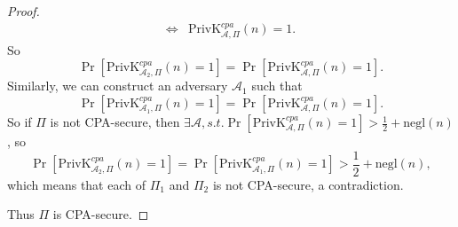 \documentclass[12pt]{article}
\newcommand{\privk}{\text{PrivK}}
\newcommand{\negl}{\text{negl}}
\newcommand{\A}{\mathcal{A}}
\newenvironment{problem}[2][Problem]{\begin{trivlist}
\item[\hskip \labelsep {\bfseries #1}\hskip \labelsep {\bfseries #2.}]}{\end{trivlist}}
\begin{document}
\begin{problem}{3.29}
\begin{proof}
\begin{align*}
    \Leftrightarrow&\privk_{\A,\Pi}^{cpa}(n)=1.
\end{align*}
So \[\Pr[\privk_{\A_2,\Pi}^{cpa}(n)=1]=\Pr[\privk_{\A,\Pi}^{cpa}(n)=1].\]
Similarly, we can construct an adversary $\A_1$ such that 
\[\Pr[\privk_{\A_1,\Pi}^{cpa}(n)=1]=\Pr[\privk_{\A,\Pi}^{cpa}(n)=1].\]
So if $\Pi$ is not CPA-secure, then 
$\exists\A,s.t.\Pr[\privk_{\A,\Pi}^{cpa}(n)=1]>\frac12+\negl(n)$, so \[\Pr[\privk_{\A_2,\Pi}^{cpa}(n)=1]=\Pr[\privk_{\A_1,\Pi}^{cpa}(n)=1]>\frac12+\negl(n),\]
which means that each of $\Pi_1$ and $\Pi_2$ is not CPA-secure, a contradiction.\par
Thus $\Pi$ is CPA-secure.
\end{proof}
\end{problem}
\end{document}
